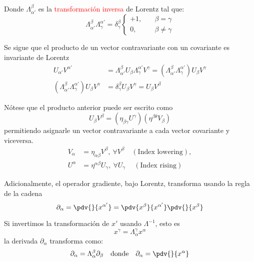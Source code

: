 \documentclass[../main]{subfiles}
\begin{document}
\begin{adjustwidth}{0pt}{-100pt}
Donde $\Lambda_{\alpha'}^{\beta}$ es la \textcolor{red}{transformación inversa} de Lorentz tal que:
\begin{equation}
    \Lambda_{\alpha'}^{\beta} \Lambda^{\alpha'}_{\gamma}=\delta^{\beta}_{\gamma} 
    \left\{
    \begin{aligned}
        +1, & \quad \beta = \gamma \\
        0,  & \quad \beta \neq \gamma
    \end{aligned}
    \right.
\end{equation}

Se sigue que el producto de un vector contravariante con un covariante es invariante de Lorentz 
\begin{equation}
    \begin{aligned}
        U_{\alpha'}V^{\alpha'}&=\Lambda_{\alpha'}^{\beta} U_{\beta} \Lambda^{\alpha'}_{\gamma} V^{\gamma}=\left(\Lambda^{\beta}_{\alpha'} \Lambda^{\alpha'}_{\gamma}\right)U_{\beta} V^{\gamma} \\
        \left(\Lambda^{\beta}_{\alpha'} \Lambda^{\alpha'}_{\gamma}\right)U_{\beta} V^{\gamma}&=\delta^{\beta}_{\gamma} U_{\beta} V^{\gamma}=U_{\beta} V^{\beta}
    \end{aligned}
\end{equation} 

Nótese que el producto anterior puede ser escrito como 
\begin{equation}
    U_{\beta} V^{\beta}=\left(\eta_{\beta\gamma}U^{\gamma}\right)\left(\eta^{\beta\theta}V_{\beta}\right)
\end{equation}
permitiendo asignarle un vector contravariante a cada vector covariante y viceversa.
\begin{align}
    V_{\alpha}&=\eta_{\alpha\beta}V^{\beta}, \ \forall V^{\beta} \quad (\text{Index lowering}),\\
    U^{\alpha}&=\eta^{\alpha\beta}U_{\gamma}, \ \forall U_{\gamma} \quad \ (\text{Index rising})
\end{align}

Adicionalmente, el operador gradiente, bajo Lorentz, transforma usando la regla de la cadena 
\begin{equation}
    \partial_{\alpha}=\pdv{}{x^{\alpha'}}=\pdv{x^{\beta}}{x^{\alpha'}}\pdv{}{x^{\beta}}
\end{equation}

Si invertimos la transformación de $x'$ usando $\Lambda^{-1}$, esto es
\begin{equation}
    x^{\gamma}=\Lambda^{\gamma}_{\alpha} x^{\alpha}
\end{equation}
la derivada $\partial_{\alpha}$ transforma como:
\begin{equation}
    \partial_{\alpha}=\Lambda^{\beta}_{\alpha} \partial_{\beta} \quad \text{donde} \quad \partial_{\alpha}=\pdv{}{x^{\alpha}}
\end{equation}


\end{adjustwidth}
\end{document}
